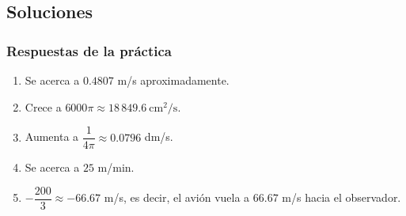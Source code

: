 \documentclass[12pt]{article}
\begin{document}
\subsection{Soluciones}

\subsubsection{Respuestas de la práctica}


\begin{enumerate}
    \item Se acerca a $0.4807$ m/s aproximadamente.
    \item Crece a $6000\pi \approx 18\,849.6\ \text{cm}^2/\text{s}$.
    \item Aumenta a $\dfrac{1}{4\pi} \approx 0.0796$ dm/s.
    \item Se acerca a $25$ m/min.
    \item $-\dfrac{200}{3} \approx -66.67$ m/s, es decir, el avión vuela a $66.67$ m/s hacia el observador.
\end{enumerate}
\end{document}
